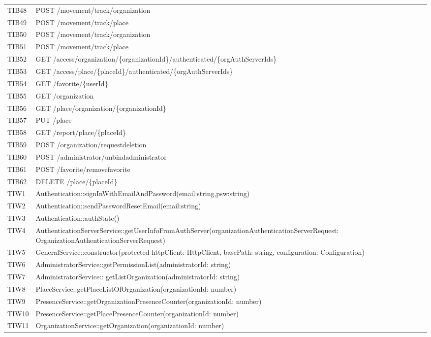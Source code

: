 {\begin{longtable}{C{2cm} C{12cm}}
	TIB48 & POST /movement/track/organization \\
	TIB49 & POST /movement/track/place \\
	TIB50 & POST /movement/track/organization \\
	TIB51 & POST /movement/track/place \\
	TIB52 & GET /access/organization/\{organizationId\}/authenticated/\{orgAuthServerIds\} \\
	TIB53 & GET /access/place/\{placeId\}/authenticated/\{orgAuthServerIds\} \\
	TIB54 & GET /favorite/\{userId\} \\
	TIB55 & GET /organization \\
	TIB56 & GET /place/organization/\{organizationId\} \\
	TIB57 & PUT /place \\
	TIB58 & GET /report/place/\{placeId\} \\
	TIB59 & POST /organization/requestdeletion \\
	TIB60 & POST /administrator/unbindadministrator \\
	TIB61 & POST /favorite/removefavorite \\
	TIB62 & DELETE /place/\{placeId\} \\
	TIW1 & Authentication::signInWithEmailAndPassword(email:string,psw:string) \\
	TIW2 & Authentication::sendPasswordResetEmail(email:string) \\
	TIW3 & Authentication::authState()\\
	TIW4 & AuthenticationServerService::getUserInfoFromAuthServer(organizationAuthenticationServerRequest: OrganizationAuthenticationServerRequest) \\
	TIW5 & GeneralService::constructor(protected httpClient: HttpClient, basePath: string, configuration: Configuration) \\
	TIW6 & AdministratorService::getPermissionList(administratorId: string)\\
	TIW7 & AdministratorService:: getListOrganization(administratorId: string)\\
	TIW8 & PlaceService::getPlaceListOfOrganization(organizationId: number)\\
	TIW9 & PresenceService::getOrganizationPresenceCounter(organizationId: number)\\
	TIW10 & PresenceService::getPlacePresenceCounter(organizationId: number)\\
	TIW11 & OrganizationService::getOrganization(organizationId: number)\\

\end{longtable}}
